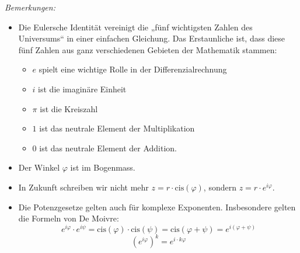 \emph{Bemerkungen:}
\begin{itemize}
	\item Die Eulersche Identität vereinigt die „fünf wichtigsten Zahlen des Universums“ in einer einfachen Gleichung. Das Erstaunliche ist, dass diese fünf Zahlen aus ganz verschiedenen Gebieten der Mathematik stammen:
	      \begin{itemize}
		      \item $e$ spielt eine wichtige Rolle in der Differenzialrechnung
		      \item $i$ ist die imaginäre Einheit
		      \item $\pi$ ist die Kreiszahl
		      \item $1$ ist das neutrale Element der Multiplikation
		      \item $0$ ist das neutrale Element der Addition.
	      \end{itemize}
	\item Der Winkel \( \varphi \) ist im Bogenmass.
	\item In Zukunft schreiben wir nicht mehr \( z = r \cdot \text{cis} (\varphi) \), sondern \( z = r\cdot e^{i\varphi} \).
	\item Die Potenzgesetze gelten auch für komplexe Exponenten. Insbesondere gelten die Formeln von De Moivre:
	      \[ e^{i\varphi} \cdot e^{i\psi} = \text{cis}(\varphi) \cdot \text{cis}(\psi) = \text{cis}(\varphi+\psi) = e^{i(\varphi+\psi)} \]
	      \[ (e^{i\varphi})^k = e^{i \cdot k\varphi} \]
\end{itemize}





